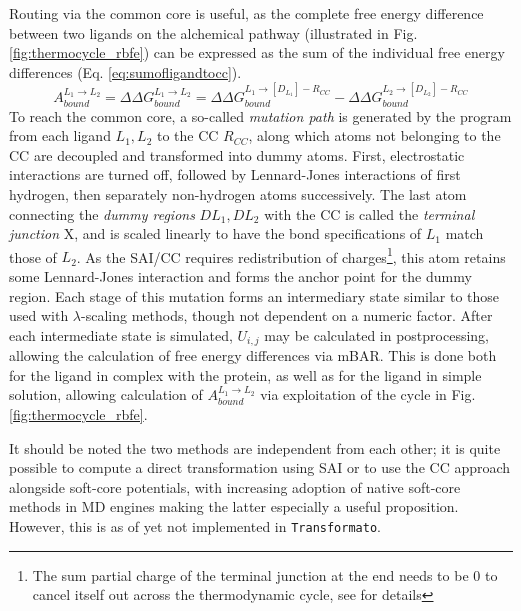 \documentclass[oneside]{scrreprt}
\begin{document}
Routing via the common core is useful, as the complete free energy difference between two ligands on the alchemical pathway (illustrated in Fig. \ref{fig:thermocycle_rbfe}) can be expressed as the sum of the individual free energy differences (Eq. \ref{eq:sumofligandtocc}).
\begin{equation}\label{eq:sumofligandtocc}
    A^{L_1\rightarrow L_2}_{bound}=\Delta \Delta G_{bound}^{L_1\rightarrow L_2}=\Delta \Delta G^{L_1\rightarrow [D_{L_1}]-R_{CC}}_{bound}-\Delta \Delta G^{L_2\rightarrow [D_{L_2}]-R_{CC}}_{bound}
\end{equation}
To reach the common core, a so-called \emph{mutation path} is generated by the program from each ligand $L_1, L_2$ to the CC $R_{CC}$, along which atoms not belonging to the CC are decoupled and transformed into dummy atoms. First, electrostatic interactions are turned off, followed by Lennard-Jones interactions of first hydrogen, then separately non-hydrogen atoms successively. The last atom connecting the \emph{dummy regions} $DL_1,DL_2$ with the CC is called the \emph{terminal junction} X, and is scaled linearly to have the bond specifications of $L_1$ match those of $L_2$. As the SAI/CC requires redistribution of charges\footnote{The sum partial charge of the terminal junction at the end needs to be 0 to cancel itself out across the thermodynamic cycle, see \cite{Karwou2022Jun,Wieder2022Jun} for details}, this atom retains some Lennard-Jones interaction and forms the anchor point for the dummy region. Each stage of this mutation forms an intermediary state similar to those used with $\lambda$-scaling methods, though not dependent on a numeric factor. After each intermediate state is simulated, $U_{i,j}$ may be calculated in postprocessing, allowing the calculation of free energy differences via mBAR. This is done both for the ligand in complex with the protein, as well as for the ligand in simple solution, allowing calculation of $A^{L_1\rightarrow L_2}_{bound}$ via exploitation of the cycle in Fig. \ref{fig:thermocycle_rbfe}.

It should be noted the two methods are independent from each other; it is quite possible to compute a direct transformation using SAI or to use the CC approach alongside soft-core potentials, with increasing adoption of native soft-core methods in MD engines making the latter especially a useful proposition. However, this is as of yet not implemented in \texttt{Transformato}.
\end{document}
